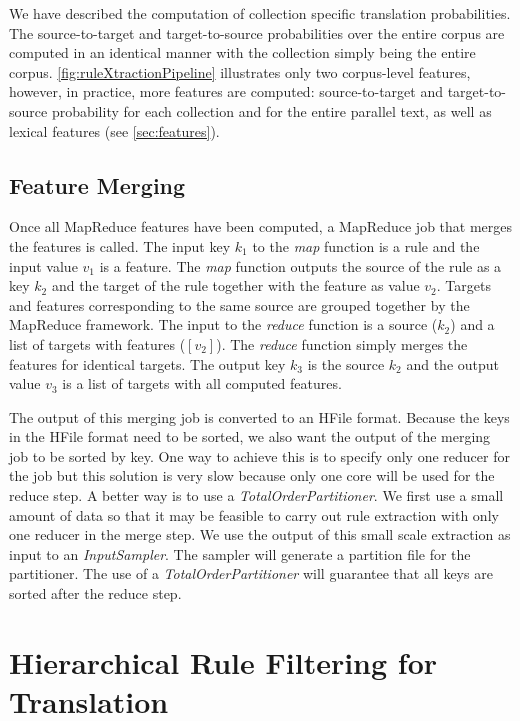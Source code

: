 We have described the computation of
collection specific translation probabilities.
The source-to-target and target-to-source probabilities over the
entire corpus are computed in an identical manner with the
collection simply being the entire corpus.
\autoref{fig:ruleXtractionPipeline} illustrates only two corpus-level
features, however, in practice, more features are computed: source-to-target
and target-to-source probability for each collection and for the entire parallel
text, as well as lexical features (see \autoref{sec:features}).

\subsection{Feature Merging}

Once all MapReduce features have been computed, a MapReduce job that merges
the features is called. The input key $k_1$ to the \emph{map} function is a
rule and the input value $v_1$ is a feature. The \emph{map} function outputs
the source of the rule as a key $k_2$ and the target of the rule together with
the feature as value $v_2$. Targets and features corresponding to the same
source are grouped together by the MapReduce framework. The input to the
\emph{reduce} function is a source ($k_2$) and a list of targets with features
($[v_2]$). The \emph{reduce} function simply merges the features for identical
targets. The output key $k_3$ is the source $k_2$ and the output value $v_3$ is
a list of targets with all computed features.

The output of this merging job
is converted to an HFile format. Because the keys in the HFile format need to
be sorted, we also want the output of the merging job to be sorted by key. One
way to achieve this is to specify only one reducer for the job but this solution
is very slow because only one core will be used for the reduce step. A better
way is to use a \emph{TotalOrderPartitioner}. We first use a small amount of
data so that it may be feasible to carry out rule extraction with only one
reducer in the merge step. We use the output of this small scale extraction as
input to an \emph{InputSampler}. The sampler will generate a partition file for
the partitioner. The use of a \emph{TotalOrderPartitioner} will guarantee that
all keys are sorted after the reduce step. %

\section{Hierarchical Rule Filtering for Translation}
\label{sec:rulextract}


